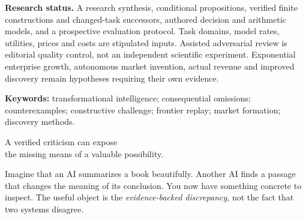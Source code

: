 \documentclass[11pt,letterpaper]{article}
\theoremstyle{remark}\newtheorem{remark}{Remark}[section]
\newcommand{\smallhead}[1]{\par\smallskip{\sffamily\bfseries\color{Gold}#1}\par\smallskip}
\begin{document}
\begin{statusbox}
\textbf{Research status.} A research synthesis, conditional propositions, verified finite constructions and changed-task successors, authored decision and arithmetic models, and a prospective evaluation protocol. Task domains, model rates, utilities, prices and costs are stipulated inputs. Assisted adversarial review is editorial quality control, not an independent scientific experiment. Exponential enterprise growth, autonomous market invention, actual revenue and improved discovery remain hypotheses requiring their own evidence.
\end{statusbox}
{\small\textbf{Keywords:} transformational intelligence; consequential omissions; counterexamples; constructive challenge; frontier replay; market formation; discovery methods.}
\clearpage
\smallhead{THE PAPER AT A GLANCE}
\begin{thesisbox}
\Large\bfseries\raggedright A verified criticism can expose\\the missing means of a valuable possibility.
\end{thesisbox}
Imagine that an AI summarizes a book beautifully. Another AI finds a passage that changes the meaning of its conclusion. You now have something concrete to inspect. The useful object is the \emph{evidence-backed discrepancy}, not the fact that two systems disagree.
\end{document}
